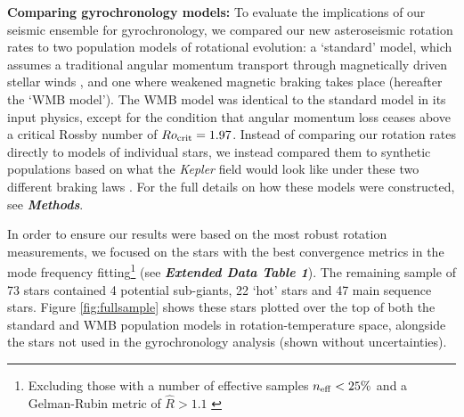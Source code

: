 \documentclass[12pt]{article}
\begin{document}
\textbf{Comparing gyrochronology models:} To evaluate the implications of our seismic ensemble for gyrochronology, we compared our new asteroseismic rotation rates to two population models of rotational evolution: a `standard' model, which assumes a traditional angular momentum transport through magnetically driven stellar winds \cite{skumanich1972, kawaler1988}, and one where weakened magnetic braking takes place (hereafter the `WMB model'). The WMB model was identical to the standard model in its input physics, except for the condition that angular momentum loss ceases above a critical Rossby number of $Ro_{\rm crit} = 1.97$. Instead of comparing our rotation rates directly to models of individual stars, we instead compared them to synthetic populations based on what the \textit{Kepler} field would look like under these two different braking laws \cite{girardi+2012,vansaders+2019}. For the full details on how these models were constructed, see \textbf{\textit{Methods}}.

In order to ensure our results were based on the most robust rotation measurements, we focused on the stars with the best convergence metrics in the mode frequency fitting\footnote{Excluding those with a number of effective samples $n_{\rm eff} < 25\%$ and a Gelman-Rubin metric of $\hat{R}>1.1$ \cite{gelman+rubin1992,salvatier+2016}} (see \textbf{\textit{Extended Data Table 1}}). The remaining sample of 73 stars contained 4 potential sub-giants, 22 `hot' stars and 47 main sequence stars. Figure \ref{fig:fullsample} shows these stars plotted over the top of both the standard and WMB population models in rotation-temperature space, alongside the stars not used in the gyrochronology analysis (shown without uncertainties).
\end{document}
